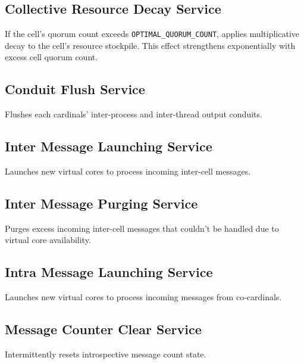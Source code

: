 \subsection{Collective Resource Decay Service}


If the cell's quorum count exceeds \texttt{OPTIMAL\_QUORUM\_COUNT}, applies multiplicative decay to the cell's resource stockpile.
This effect strengthens exponentially with excess cell quorum count.

\subsection{Conduit Flush Service}


Flushes each cardinals' inter-process and inter-thread output conduits.

\subsection{Inter Message Launching Service}


Launches new virtual cores to process incoming inter-cell messages.

\subsection{Inter Message Purging Service}


Purges excess incoming inter-cell messages that couldn't be handled due to virtual core availability.

\subsection{Intra Message Launching Service}


Launches new virtual cores to process incoming messages from co-cardinals.

\subsection{Message Counter Clear Service}


Intermittently resets introspective message count state.

